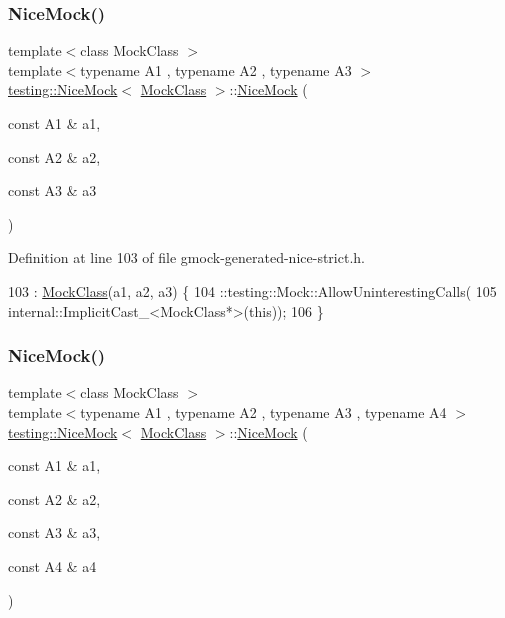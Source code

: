 \subsubsection{\texorpdfstring{Nice\+Mock()}{NiceMock()}\hspace{0.1cm}{\footnotesize\ttfamily [4/11]}}
{\footnotesize\ttfamily template$<$class Mock\+Class $>$ \\
template$<$typename A1 , typename A2 , typename A3 $>$ \\
\hyperlink{classtesting_1_1NiceMock}{testing\+::\+Nice\+Mock}$<$ \hyperlink{classMockClass}{Mock\+Class} $>$\+::\hyperlink{classtesting_1_1NiceMock}{Nice\+Mock} (\begin{DoxyParamCaption}\item[{const A1 \&}]{a1,  }\item[{const A2 \&}]{a2,  }\item[{const A3 \&}]{a3 }\end{DoxyParamCaption})\hspace{0.3cm}{\ttfamily [inline]}}



Definition at line 103 of file gmock-\/generated-\/nice-\/strict.\+h.


\begin{DoxyCode}
103                                                      : \hyperlink{classMockClass}{MockClass}(a1, a2, a3) \{
104     ::testing::Mock::AllowUninterestingCalls(
105         internal::ImplicitCast\_<MockClass*>(\textcolor{keyword}{this}));
106   \}
\end{DoxyCode}
\mbox{\label{classtesting_1_1NiceMock_a5ffbe1a648f16612266d4e67a2d063d1}} 
\subsubsection{\texorpdfstring{Nice\+Mock()}{NiceMock()}\hspace{0.1cm}{\footnotesize\ttfamily [5/11]}}
{\footnotesize\ttfamily template$<$class Mock\+Class $>$ \\
template$<$typename A1 , typename A2 , typename A3 , typename A4 $>$ \\
\hyperlink{classtesting_1_1NiceMock}{testing\+::\+Nice\+Mock}$<$ \hyperlink{classMockClass}{Mock\+Class} $>$\+::\hyperlink{classtesting_1_1NiceMock}{Nice\+Mock} (\begin{DoxyParamCaption}\item[{const A1 \&}]{a1,  }\item[{const A2 \&}]{a2,  }\item[{const A3 \&}]{a3,  }\item[{const A4 \&}]{a4 }\end{DoxyParamCaption})\hspace{0.3cm}{\ttfamily [inline]}}



